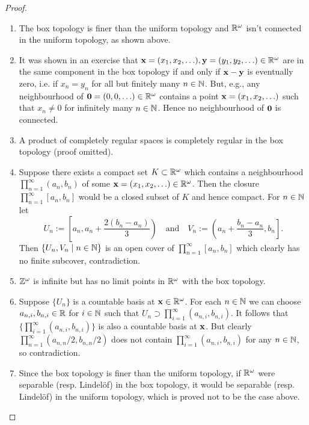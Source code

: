 \begin{proof}
  \begin{enumerate}[leftmargin=*]
  \item The box topology is finer than the uniform topology and $\mathbb{R}^\omega$ isn't connected in the uniform topology, as shown above. 
  \item It was shown in an exercise that $\boldsymbol{\mathbf{x}} = (x_1, x_2, \ldots), \boldsymbol{\mathbf{y}} = (y_1, y_2, \ldots) \in \mathbb{R}^\omega$ are in the same component in the box topology if and only if $\boldsymbol{\mathbf{x}} - \boldsymbol{\mathbf{y}}$ is eventually zero, i.e. if $x_n = y_n$ for all but finitely many $n \in \mathbb{N}$. But, e.g., any neighbourhood of $\boldsymbol{\mathbf{0}} = (0,0,\ldots) \in \mathbb{R}^\omega$ contains a point $\boldsymbol{\mathbf{x}} = (x_1, x_2, \ldots)$ such that $x_n \ne 0$ for infinitely many $n \in \mathbb{N}$. Hence no neighbourhood of $\boldsymbol{\mathbf{0}}$ is connected. 
  \item A product of completely regular spaces is completely regular in the box topology (proof omitted).
  \item Suppose there exists a compact set $K \subset \mathbb{R}^\omega$ which contains a neighbourhood $\prod_{n=1}^\infty (a_n,b_n)$ of some $\boldsymbol{\mathbf{x}} = (x_1,x_2, \ldots) \in \mathbb{R}^\omega$. Then the closure $\prod_{n=1}^\infty [a_n,b_n]$ would be a closed subset of $K$ and hence compact. For $n \in \mathbb{N}$ let 
    \[ U_n := \left[a_n, a_n + \frac{2(b_n-a_n)}3\right)\quad\text{and}\quad V_n := \left(a_n + \frac{b_n-a_n}3, b_n\right]. \]
    Then $\{U_n, V_n \mid n \in \mathbb{N}\}$ is an open cover of $\prod_{n=1}^\infty [a_n,b_n]$ which clearly has no finite subcover, contradiction.
  \item $\mathbb{Z}^\omega$ is infinite but has no limit points in $\mathbb{R}^\omega$ with the box topology.
  \item Suppose $\{U_n\}$ is a countable basis at $\boldsymbol{\mathbf{x}} \in \mathbb{R}^\omega$. For each $n \in \mathbb{N}$ we can choose $a_{n,i},b_{n,i} \in \mathbb{R}$ for $i \in \mathbb{N}$ such that $U_n \supset \prod_{i=1}^\infty (a_{n,i}, b_{n,i})$. It follows that  $\{\prod_{i=1}^\infty (a_{n,i}, b_{n,i})\}$ is also a countable basis at $\boldsymbol{\mathbf{x}}$. But clearly $\prod_{n=1}^\infty (a_{n,n}/2, b_{n,n}/2)$ does not contain $\prod_{i=1}^\infty (a_{n,i}, b_{n,i})$ for any $n \in \mathbb{N}$, so contradiction. 
  \item Since the box topology is finer than the uniform topology, if $\mathbb{R}^\omega$ were separable (resp. Lindel\"of) in the box topology, it would be separable (resp. Lindel\"of) in the uniform topology, which is proved not to be the case above. \qedhere
  \end{enumerate}
\end{proof}

